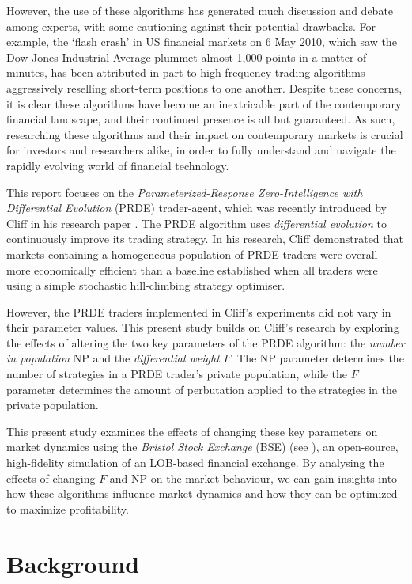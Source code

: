 \documentclass[conference]{IEEEtran}
\begin{document}
However, the use of these algorithms has generated much discussion and debate among experts, with some cautioning against their potential drawbacks.
For example, the `flash crash' in US financial markets on 6 May 2010, which saw the Dow Jones Industrial Average plummet almost 1,000 points in a matter of minutes, has been attributed in part to high-frequency trading algorithms aggressively reselling short-term positions to one another.
Despite these concerns, it is clear these algorithms have become an inextricable part of the contemporary financial landscape, and their continued presence is all but guaranteed.
As such, researching these algorithms and their impact on contemporary markets is crucial for investors and researchers alike, in order to fully understand and navigate the rapidly evolving world of financial technology.

This report focuses on the \textit{Parameterized-Response Zero-Intelligence with Differential Evolution} (PRDE) trader-agent, which was recently introduced by Cliff in his research paper \cite{PRDE}.
The PRDE algorithm uses \textit{differential evolution} \cite{StornPrice} to continuously improve its trading strategy.
In his research, Cliff demonstrated that markets containing a homogeneous population of PRDE traders were overall more economically efficient than a baseline established when all traders were using a simple stochastic hill-climbing strategy optimiser.

However, the PRDE traders implemented in Cliff's experiments did not vary in their parameter values.
This present study builds on Cliff's research by exploring the effects of altering the two key parameters of the PRDE algorithm: the \textit{number in population} $\mathrm{NP}$ and the \textit{differential weight} $F$.
The $\mathrm{NP}$ parameter determines the number of strategies in a PRDE trader's private population, while the $F$ parameter determines the amount of perbutation applied to the strategies in the private population.

This present study examines the effects of changing these key parameters on market dynamics using the \textit{Bristol Stock Exchange} (BSE) (see \cite{BSE, BSEPaper}), an open-source, high-fidelity simulation of an LOB-based financial exchange.
By analysing the effects of changing $F$ and $\mathrm{NP}$ on the market behaviour, we can gain insights into how these algorithms influence market dynamics and how they can be optimized to maximize profitability.

\section{Background}
\end{document}
